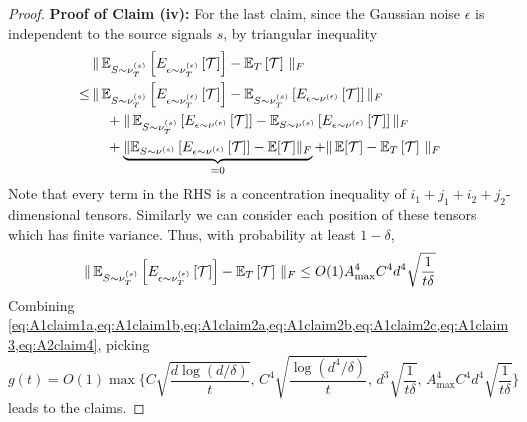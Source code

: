 \begin{proof}
	\vspace{5mm}
	{\bf Proof of Claim (iv):} 
	For the last claim, since the Gaussian noise $\epsilon$ is independent to the source signals $s$, by triangular inequality 
	\begin{align*}
	& \|\, 
	\mathbb{E}_{S\sim \nu_T^{(s)}}\left[E_{\epsilon\sim \nu_T^{(\epsilon)}}\left[\mathcal{T}\right]\right] - 
	\mathbb{E}_T\left[\mathcal{T}\right]\,\|_F \\
	\le\, & \|\,\mathbb{E}_{S\sim \nu_T^{(s)}}\left[E_{\epsilon\sim \nu_T^{(\epsilon)}}\left[\mathcal{T}\right]\right] - \mathbb{E}_{S\sim \nu_T^{(s)}}\left[E_{\epsilon\sim \nu^{(\epsilon)}}\left[\mathcal{T}\right]\right]\|_F \\
	& \quad + \|\,\mathbb{E}_{S\sim \nu_T^{(s)}}\left[E_{\epsilon\sim \nu^{(\epsilon)}}\left[\mathcal{T}\right]\right] - \mathbb{E}_{S\sim \nu^{(s)}}\left[E_{\epsilon\sim \nu^{(\epsilon)}}\left[\mathcal{T}\right]\right]\|_F\\
	& \quad + \underbrace{\|\mathbb{E}_{S\sim \nu^{(s)}}\left[E_{\epsilon\sim \nu^{(\epsilon)}}\left[\mathcal{T}\right]\right]  - \mathbb{E}[\mathcal{T}] \|_F}_{=0} 
	+ \|\,\mathbb{E}[\mathcal{T}] - \mathbb{E}_T\left[\mathcal{T}\right]\,\|_F
	\end{align*}
	Note that every term in the RHS is a concentration inequality of $i_1+j_1+i_2+j_2$-dimensional tensors. Similarly we can consider each position of these tensors which has finite variance.
	Thus, with probability at least $1-\delta$,   
	\begin{equation}
	\label{eq:A2claim4}
	\|\, 
	\mathbb{E}_{S\sim \nu_T^{(s)}}\left[E_{\epsilon\sim \nu_T^{(\epsilon)}}\left[\mathcal{T}\right]\right] - 
	\mathbb{E}_T\left[\mathcal{T}\right]\,\|_F \le O(1)A_{\max}^4C^4d^4\sqrt{\frac{1}{t\delta}}
	\end{equation}
	Combining \cref{eq:A1claim1a,eq:A1claim1b,eq:A1claim2a,eq:A1claim2b,eq:A1claim2c,eq:A1claim3,eq:A2claim4}, picking 
	$$
	g(t) = O(1) \max\{
	C\sqrt{\frac{d\log(d/\delta)}{t}},\,
	C^4\sqrt{\frac{\log(d^4/\delta)}{t}},\,
	d^3\sqrt{\frac{1}{t\delta}},\,
	A_{\max}^4C^4d^4\sqrt{\frac{1}{t\delta}}\}
	$$
	leads to the claims.
	

\end{proof}
